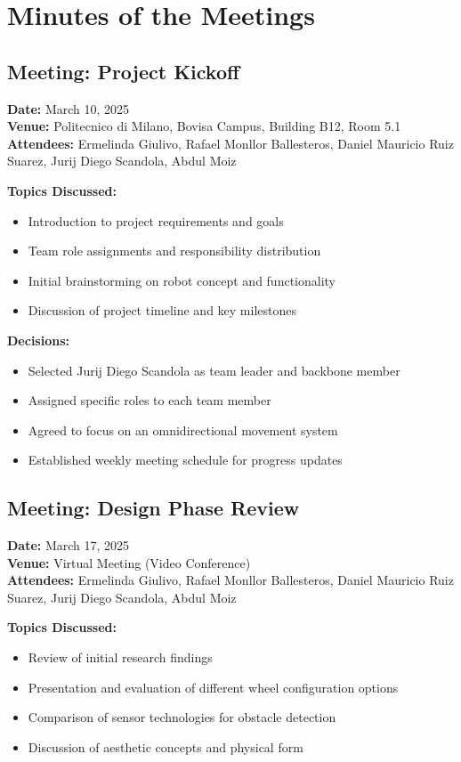 \section{Minutes of the Meetings}

\subsection{Meeting: Project Kickoff}
\textbf{Date:} March 10, 2025\\
\textbf{Venue:} Politecnico di Milano, Bovisa Campus, Building B12, Room 5.1\\
\textbf{Attendees:} Ermelinda Giulivo, Rafael Monllor Ballesteros, Daniel Mauricio Ruiz Suarez, Jurij Diego Scandola, Abdul Moiz

\textbf{Topics Discussed:}
\begin{itemize}
    \item Introduction to project requirements and goals
    \item Team role assignments and responsibility distribution
    \item Initial brainstorming on robot concept and functionality
    \item Discussion of project timeline and key milestones
\end{itemize}

\textbf{Decisions:}
\begin{itemize}
    \item Selected Jurij Diego Scandola as team leader and backbone member
    \item Assigned specific roles to each team member
    \item Agreed to focus on an omnidirectional movement system
    \item Established weekly meeting schedule for progress updates
\end{itemize}

\subsection{Meeting: Design Phase Review}
\textbf{Date:} March 17, 2025\\
\textbf{Venue:} Virtual Meeting (Video Conference)\\
\textbf{Attendees:} Ermelinda Giulivo, Rafael Monllor Ballesteros, Daniel Mauricio Ruiz Suarez, Jurij Diego Scandola, Abdul Moiz

\textbf{Topics Discussed:}
\begin{itemize}
    \item Review of initial research findings
    \item Presentation and evaluation of different wheel configuration options
    \item Comparison of sensor technologies for obstacle detection
    \item Discussion of aesthetic concepts and physical form
\end{itemize}

